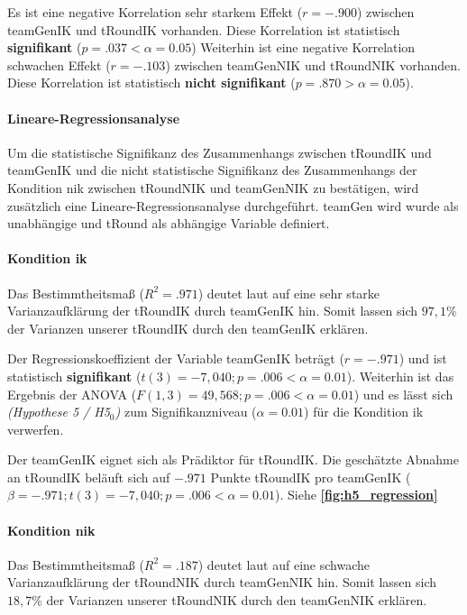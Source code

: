 \documentclass[a4paper,11pt]{article}%
\renewcommand{\\}{\vspace*{0.5\baselineskip} \newline}
\begin{document}
Es ist eine negative Korrelation sehr starkem Effekt ($r = -.900$) zwischen \ac{teamGenIK} und \ac{tRoundIK} vorhanden. Diese Korrelation ist statistisch \textbf{signifikant} ($p = .037 < \alpha = 0.05$)
Weiterhin ist eine negative Korrelation schwachen Effekt ($r = -.103$) zwischen \ac{teamGenNIK} und \ac{tRoundNIK} vorhanden. Diese Korrelation ist statistisch \textbf{nicht signifikant} ($p = .870 > \alpha = 0.05$).

		\paragraph{Lineare-Regressionsanalyse}
Um die statistische Signifikanz des Zusammenhangs zwischen \ac{tRoundIK} und \ac{teamGenIK} und die nicht statistische Signifikanz des Zusammenhangs der Kondition \ac{nik} zwischen \ac{tRoundNIK} und \ac{teamGenNIK} zu bestätigen, wird zusätzlich eine Lineare-Regressionsanalyse durchgeführt.
\ac{teamGen} wird wurde als unabhängige und \ac{tRound} als abhängige Variable definiert.

\paragraph{Kondition \ac{ik}}
Das Bestimmtheitsmaß ($R^{2} = .971$) deutet laut \citep{cohen2013statistical} auf eine sehr starke Varianzaufklärung der \ac{tRoundIK} durch \ac{teamGenIK} hin. Somit lassen sich $97,1\%$ der Varianzen unserer \ac{tRoundIK} durch den \ac{teamGenIK} erklären.

Der Regressionskoeffizient der Variable \ac{teamGenIK} beträgt ($r = -.971$) und ist statistisch \textbf{signifikant} ($t(3) = -7,040; p = .006 < \alpha = 0.01$). \\
Weiterhin ist das Ergebnis der ANOVA ($F(1,3) = 49,568; p = .006 < \alpha = 0.01$) und es lässt sich \textit{(Hypothese 5 / H5$_{0}$)} zum Signifikanzniveau ($\alpha = 0.01$) für die Kondition \ac{ik} verwerfen.

Der \ac{teamGenIK} eignet sich als Prädiktor für \ac{tRoundIK}. Die geschätzte Abnahme an \ac{tRoundIK} beläuft sich auf $-.971$ Punkte \ac{tRoundIK} pro \ac{teamGenIK} ($\beta = -.971; t(3) = -7,040; p = .006 < \alpha = 0.01$). Siehe \textbf{\autoref{fig:h5_regression}}

\paragraph{Kondition \ac{nik}}
Das Bestimmtheitsmaß ($R^{2} = .187$) deutet laut \citep{cohen2013statistical} auf eine schwache Varianzaufklärung der \ac{tRoundNIK} durch \ac{teamGenNIK} hin. Somit lassen sich $18,7\%$ der Varianzen unserer \ac{tRoundNIK} durch den \ac{teamGenNIK} erklären.
\end{document}
